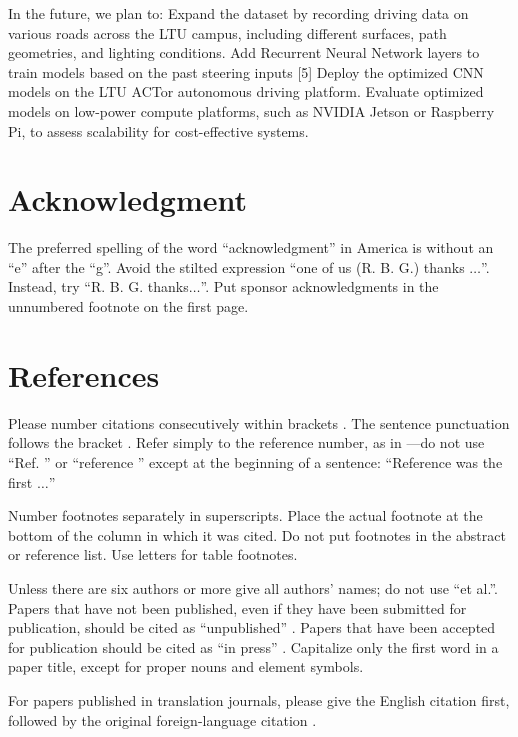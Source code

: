\documentclass[conference]{IEEEtran}
\begin{document}
In the future, we plan to:
Expand the dataset by recording driving data on various roads across the LTU campus, including different surfaces, path geometries, and lighting conditions.
Add Recurrent Neural Network layers to train models based on the past steering inputs [5]
Deploy the optimized CNN models on the LTU ACTor autonomous driving platform.
Evaluate optimized models on low-power compute platforms, such as NVIDIA Jetson or Raspberry Pi, to assess scalability for cost-effective systems.



\section*{Acknowledgment}

The preferred spelling of the word ``acknowledgment'' in America is without 
an ``e'' after the ``g''. Avoid the stilted expression ``one of us (R. B. 
G.) thanks $\ldots$''. Instead, try ``R. B. G. thanks$\ldots$''. Put sponsor 
acknowledgments in the unnumbered footnote on the first page.

\section*{References}

Please number citations consecutively within brackets \cite{b1}. The 
sentence punctuation follows the bracket \cite{b2}. Refer simply to the reference 
number, as in \cite{b3}---do not use ``Ref. \cite{b3}'' or ``reference \cite{b3}'' except at 
the beginning of a sentence: ``Reference \cite{b3} was the first $\ldots$''

Number footnotes separately in superscripts. Place the actual footnote at 
the bottom of the column in which it was cited. Do not put footnotes in the 
abstract or reference list. Use letters for table footnotes.

Unless there are six authors or more give all authors' names; do not use 
``et al.''. Papers that have not been published, even if they have been 
submitted for publication, should be cited as ``unpublished'' \cite{b4}. Papers 
that have been accepted for publication should be cited as ``in press'' \cite{b5}. 
Capitalize only the first word in a paper title, except for proper nouns and 
element symbols.

For papers published in translation journals, please give the English 
citation first, followed by the original foreign-language citation \cite{b6}.
\end{document}
